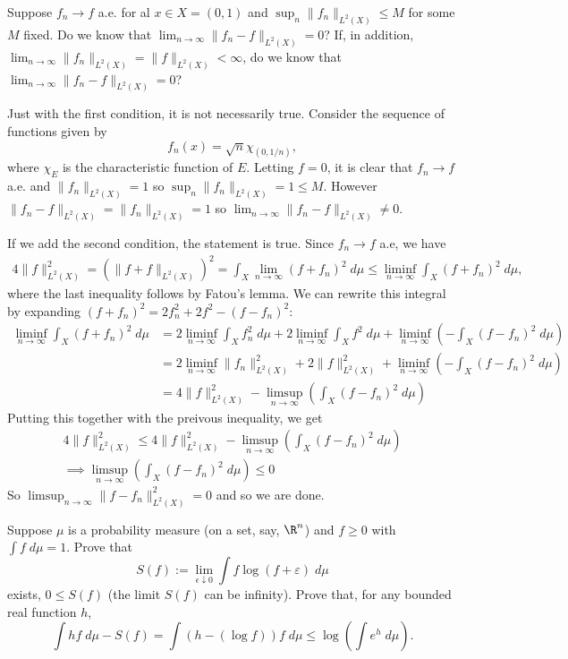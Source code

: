 \documentclass[11pt,letterpaper]{article}
\begin{document}
\begin{problem}
    Suppose $f_n \to f$ a.e. for al $x\in X=(0,1)$ and $\sup_n \|f_n\|_{L^2(X)} \leq M$ for some $M$ fixed. Do we know that $\lim_{n\to\infty} \|f_n - f\|_{L^2(X)} = 0$? If, in addition, $\lim_{n\to \infty}\|f_n\|_{L^2(X)}=\|f\|_{L^2(X)} < \infty$, do we know that $\lim_{n\to \infty}\|f_n-f\|_{L^2(X)}=0$? 
\end{problem}

\quad Just with the first condition, it is not necessarily true. Consider the sequence of functions given by
\[
    f_n(x) = \sqrt{n}\chi_{(0,1/ n)},
\]
where $\chi_E$ is the characteristic function of $E$. Letting $f=0$, it is clear that $f_n \to f$ a.e. and $\|f_n\|_{L^2(X)} = 1$ so $\sup_n \|f_n\|_{L^2(X)} = 1 \leq M$. However $\|f_n - f\|_{L^2(X)} = \|f_n\|_{L^2(X)} = 1$ so $\lim_{n\to \infty} \|f_n - f\|_{L^2(X)}\neq 0$.

\quad If we add the second condition, the statement is true. Since $f_n \to f$ a.e, we have
\[
    \begin{aligned}
        4\|f\|^2_{L^2(X)} = \left(\|f+f\|_{L^2(X)}\right)^2= \int_X \lim_{n\to \infty} (f+f_n)^2\;d\mu \leq \liminf_{n\to \infty}\int_X (f+f_n)^2\;d\mu,
    \end{aligned}
\]
where the last inequality follows by Fatou's lemma. We can rewrite this integral by expanding $(f+f_n)^2=2f_n^2 + 2f^2 - (f - f_n)^2$:
\[
    \begin{aligned}
        \liminf_{n\to \infty}\int_X (f+f_n)^2\;d\mu &= 2\liminf_{n\to \infty} \int_X f_n^2\;d\mu + 2\liminf_{n\to \infty} \int_X f^2\;d\mu + \liminf_{n\to \infty}\left(-\int_X (f-f_n)^2\;d\mu\right)\\
        &=2\liminf_{n\to \infty}\|f_n\|^2_{L^2(X)} + 2\|f\|^2_{L^2(X)} + \liminf_{n\to \infty}\left(-\int_X (f-f_n)^2\;d\mu\right)\\
        &= 4\|f\|^2_{L^2(X)} - \limsup_{n\to \infty}\left(\int_X (f-f_n)^2\;d\mu\right)
    \end{aligned}
\]   
Putting this together with the preivous inequality, we get
\[
    \begin{aligned}
        4\|f\|^2_{L^2(X)} \leq 4\|f\|^2_{L^2(X)} - \limsup_{n\to \infty}\left(\int_X (f-f_n)^2\;d\mu\right)\\
        \implies \limsup_{n\to \infty}\left(\int_X (f-f_n)^2\;d\mu\right) \leq 0
    \end{aligned}
\] 
So $\limsup_{n\to \infty} \|f-f_n\|^2_{L^2(X)} = 0$ and so we are done. 

\pagebreak
\begin{problem}
    Suppose $\mu$ is a probability measure (on a set, say, $\R^n$) and $f\geq 0$ with $\int f\;d\mu = 1$. Prove that
    \[
        S(f) := \lim_{\epsilon \downarrow 0} \int f \log(f+\varepsilon)\;d\mu
    \]
    exists, $0\leq S(f)$ (the limit $S(f)$ can be infinity). Prove that, for any bounded real function $h$,
    \[
        \int hf\;d\mu - S(f) = \int \left(h - (\log f)\right) f\;d\mu \leq \log \left(\int e^h\;d\mu\right)
    .\]  
\end{problem}
\end{document}
